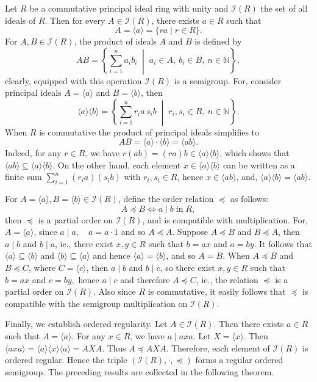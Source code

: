 \documentclass[12pt,a4paper]{amsart}
\theoremstyle{plain}
\theoremstyle{definition}
\begin{document}
Let $R$ be a commutative principal ideal ring with unity and $\mathcal{I}(R)$ the set of all ideals of $R$. 
Then for every $A \in \mathcal{I}(R)$, there exists $a \in R$ such that
\[
A = \langle a \rangle = \{ra \mid r \in R\}.
\]
For $A, B \in \mathcal{I}(R)$, the product of ideals $A$ and $B$ is defined by
\[
AB = \left\{ \sum_{i=1}^{n} a_i b_i \;\middle|\; a_i \in A,\ b_i \in B,\ n \in \mathbb{N} \right\},
\]
clearly, equipped with this operation $\mathcal{I}(R)$ is a semigroup.
For, consider principal ideals $A = \langle a \rangle$ and $B = \langle b \rangle$, then
\[
\langle a \rangle \langle b \rangle 
= \left\{ \sum_{i=1}^{n} r_i a\, s_i b \;\middle|\; r_i, s_i \in R,\ n \in \mathbb{N} \right\}.
\]
When $R$ is commutative the product of principal ideals simplifies to
\[
AB = \langle a \rangle \cdot \langle b \rangle = \langle ab \rangle.
\]
Indeed, for any $r \in R$, we have $r(ab) = (ra)b \in \langle a\rangle\langle b\rangle$, which shows that
$\langle ab\rangle \subseteq \langle a\rangle\langle b\rangle$.
On the other hand, each element
$ x \in \langle a\rangle\langle b\rangle $
can be written as a finite sum $\sum_{i=1}^n (r_i a)(s_i b)$ with $r_i,s_i \in R$,
 hence $x \in \langle ab\rangle$, and,
$\langle a\rangle\langle b\rangle = \langle ab\rangle.$

For $A  = \langle a \rangle, B = \langle b \rangle \in \mathcal{I}(R)$, define the order relation $\preccurlyeq$ as follows: 
\[
A \preccurlyeq B \iff a \mid b \;\text{in}\; R,
\]
then $\preccurlyeq$ is a partial order on $\mathcal{I}(R)$, and is compatible with multiplication. For,  $A = \langle a \rangle$, since $a \mid a, \quad a = a \cdot 1$ and so $A \preccurlyeq A$.
Suppose $A \preccurlyeq B$ and $B \preccurlyeq A$, then $a \mid b$ and $b \mid a$, ie., there exist
$x,y \in R$ such that $b=ax$ and $a=by$. It follows that
$\langle a\rangle \subseteq \langle b\rangle$ and
$\langle b\rangle \subseteq \langle a\rangle$ and hence
$\langle a\rangle=\langle b\rangle$, and so $A =B$.
When $A \preccurlyeq B$ and $B \preccurlyeq C$, where $C = \langle c \rangle$, then $a \mid b$ and $b \mid c$, so there exist $x, y \in R$ such that
$b = ax $ and $ c = by,$  hence $a \mid c$ and therefore  $A \preccurlyeq C$, ie., the relation 
$\preccurlyeq$ is a partial order on $\mathcal{I}(R)$.
Also since $R$ is commutative, it easily follows that $\preccurlyeq$ is compatible with the semigroup multiplication on $\mathcal{I}(R)$.

Finally, we establish ordered regularity. Let $A \in \mathcal{I}(R)$. Then there exists $a \in R$ such that $A = \langle a \rangle$. 
For any $x \in R$, we have $a \mid axa$. Let $X = \langle x \rangle$. Then $
\langle axa \rangle = \langle a \rangle \langle x \rangle \langle a \rangle = AXA.$
Thus $A \preccurlyeq AXA$.
Therefore, each element of $\mathcal{I}(R)$ is ordered regular. Hence the triple $(\mathcal{I}(R), \cdot, \preccurlyeq)$ forms a regular ordered semigroup.
The preceding results are collected in the following theorem.
\end{document}
